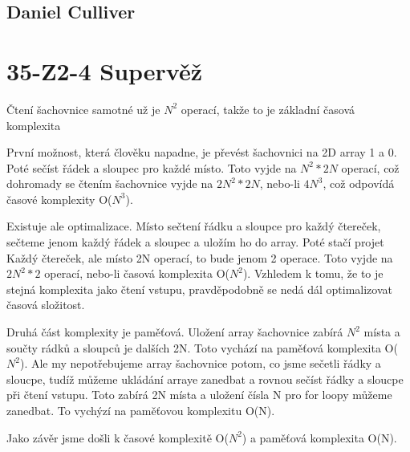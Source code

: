 \documentclass[12pt]{article}
\begin{document}
\subsection*{Daniel Culliver}
\section*{35-Z2-4 Supervěž}
Čtení šachovnice samotné už je $N^2$ operací, takže to je základní časová komplexita

První možnost, která člověku napadne, je převést šachovnici na 2D array 1 a 0.
Poté sečíst řádek a sloupec pro každé místo.
Toto vyjde na $N^2 * 2N$ operací, což dohromady se čtením šachovnice vyjde na
$2N^2 * 2N$, nebo-li $4N^3$, což odpovídá časové komplexity O($N^3$).

Existuje ale optimalizace. Místo sečtení řádku a sloupce pro každý čtereček,
sečteme jenom každý řádek a sloupec a uložím ho do array.
Poté stačí projet Každý čtereček, ale místo 2N operací, to bude jenom 2 operace.
Toto vyjde na $2N^2 * 2$ operací, nebo-li časová komplexita O($N^2$).
Vzhledem k tomu, že to je stejná komplexita jako čtení vstupu,
pravděpodobně se nedá dál optimalizovat časová složitost.

Druhá část komplexity je paměťová. Uložení array šachovnice zabírá $N^2$ místa
a součty rádků a sloupců je dalších 2N. Toto vychází na paměťová komplexita O($N^2$).
Ale my nepotřebujeme array šachovnice potom, co jsme sečetli řádky a sloucpe,
tudíž můžeme ukládání arraye zanedbat a rovnou sečíst řádky a sloucpe při čtení vstupu.
Toto zabírá 2N místa a uložení čísla N pro for loopy můžeme zanedbat.
To vychýzí na paměťovou komplexitu O(N).

Jako závěr jsme došli k časové komplexitě O($N^2$) a paměťová komplexita O(N).
\end{document}
